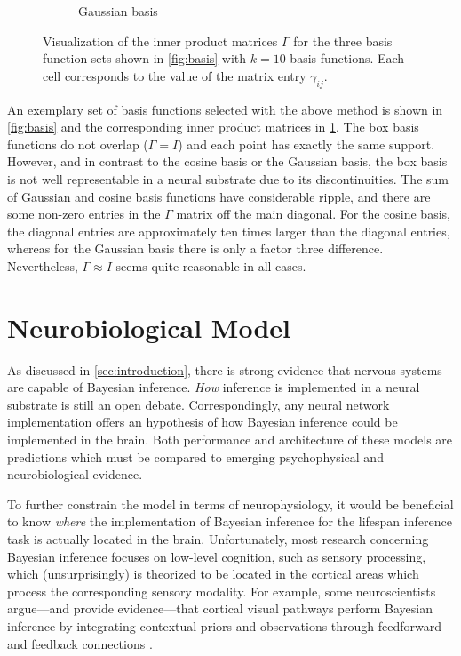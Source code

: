\documentclass[a4paper,11pt]{article}
\begin{document}
\begin{figure}
\begin{subfigure}{0.33\textwidth}
		\caption{Gaussian basis}%
	\end{subfigure}
	\caption{Visualization of the inner product matrices $\Gamma$ for the three basis function sets shown in \cref{fig:basis} with $k = 10$ basis functions. Each cell corresponds to the value of the matrix entry $\gamma_{ij}$.}
	\label{fig:basis_prod}
\end{figure}
An exemplary set of basis functions selected with the above method is shown in \cref{fig:basis} and the corresponding inner product matrices in \cref{fig:basis_prod}. The box basis functions do not overlap ($\Gamma = I$) and each point has exactly the same support. However, and in contrast to the cosine basis or the Gaussian basis, the box basis is not well representable in a neural substrate due to its discontinuities. The sum of Gaussian and cosine basis functions have considerable ripple, and there are some non-zero entries in the $\Gamma$ matrix off the main diagonal. For the cosine basis, the diagonal entries are approximately ten times larger than the diagonal entries, whereas for the Gaussian basis there is only a factor three difference. Nevertheless, $\Gamma \approx I$ seems quite reasonable in all cases.




\pagebreak
\section{Neurobiological Model}
\label{sec:architecture}

As discussed in \cref{sec:introduction}, there is strong evidence that nervous systems are capable of Bayesian inference. \emph{How} inference is implemented in a neural substrate is still an open debate. Correspondingly, any neural network implementation offers an hypothesis of how Bayesian inference could be implemented in the brain. Both performance and architecture of these models are predictions which must be compared to emerging psychophysical and neurobiological evidence.

To further constrain the model in terms of neurophysiology, it would be beneficial to know \emph{where} the implementation of Bayesian inference for the lifespan inference task is actually located in the brain. Unfortunately, most research concerning Bayesian inference focuses on low-level cognition, such as sensory processing, which (unsurprisingly) is theorized to be located in the cortical areas which process the corresponding sensory modality. For example, some neuroscientists argue---and provide evidence---that cortical visual pathways perform Bayesian inference by integrating contextual priors and observations through feedforward and feedback connections \cite{lee2003hierarchical}.
\end{document}
